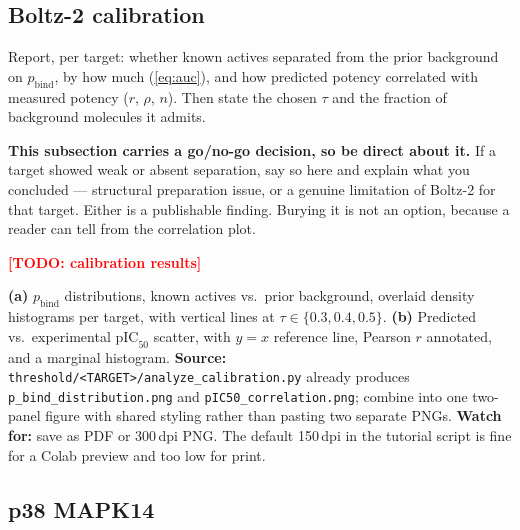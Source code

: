 \documentclass[11pt]{article}
\newcommand{\TODO}[1]{\textcolor{red}{\textbf{[TODO: #1]}}}
\newcommand{\pbind}{p_{\mathrm{bind}}}          %
\newcommand{\pICfifty}{\mathrm{pIC}_{50}}
\begin{document}
\subsection{Boltz-2 calibration}
\label{sec:results:calib}

\begin{yourturn}
Report, per target: whether known actives separated from the prior background
on $\pbind$, by how much (\cref{eq:auc}), and how predicted potency correlated
with measured potency ($r$, $\rho$, $n$). Then state the chosen $\tau$ and the
fraction of background molecules it admits.

\smallskip
\textbf{This subsection carries a go/no-go decision, so be direct about it.}
If a target showed weak or absent separation, say so here and explain what you
concluded --- structural preparation issue, or a genuine limitation of Boltz-2
for that target. Either is a publishable finding. Burying it is not an option,
because a reader can tell from the correlation plot.
\end{yourturn}

\TODO{calibration results}

\begin{figrec}
\textbf{(a)} $\pbind$ distributions, known actives vs.\ prior background,
overlaid density histograms per target, with vertical lines at
$\tau \in \{0.3, 0.4, 0.5\}$.
\textbf{(b)} Predicted vs.\ experimental $\pICfifty$ scatter, with $y=x$
reference line, Pearson $r$ annotated, and a marginal histogram.
\textbf{Source:} \texttt{threshold/<TARGET>/analyze\_calibration.py} already
produces \texttt{p\_bind\_distribution.png} and
\texttt{pIC50\_correlation.png}; combine into one two-panel figure with shared
styling rather than pasting two separate PNGs.
\textbf{Watch for:} save as PDF or 300\,dpi PNG. The default 150\,dpi in the
tutorial script is fine for a Colab preview and too low for print.
\end{figrec}


\subsection{p38 MAPK14}
\label{sec:results:p38}
\end{document}
